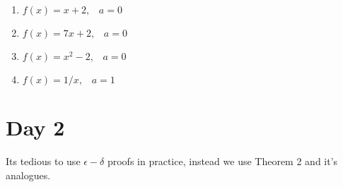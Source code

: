 \documentclass[9pt, a4paper, oneside]{amsart}
\begin{document}
\begin{questions}
\begin{itemize}
		      \begin{enumerate}
		      	\item $f(x)=x+2, \hspace{10pt} a=0$
		      	\item $f(x)=7x+ 2, \hspace{10pt} a=0$
		      	\item $f(x)=x^2-2, \hspace{10pt} a=0$
		      	\item $f(x)=1/x, \hspace{10pt} a=1$
		      \end{enumerate}
	\end{itemize}
\end{questions}








\newpage\section*{Day 2}

Its tedious to use $ \epsilon-\delta $ proofs in practice, instead we use Theorem 2 and it's analogues.\\
\end{document}
